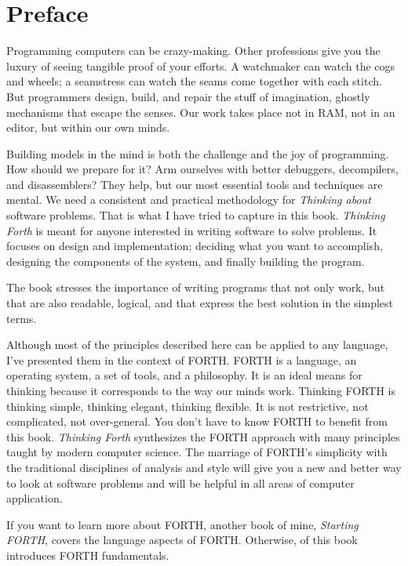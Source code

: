 \chapter*{Preface}

Programming computers can be crazy-making. Other professions give
you the luxury of seeing tangible proof of your efforts. A watchmaker
can watch the cogs and wheels; a seamstress can watch the seams come
together with each stitch. But programmers design, build, and repair
the stuff of imagination, ghostly mechanisms that escape the senses.
Our work takes place not in RAM, not in an editor, but within our
own minds.

Building models in the mind is both the challenge and the joy of programming.
How should we prepare for it? Arm ourselves with better debuggers,
decompilers, and disassemblers? They help, but our most essential
tools and techniques are mental. We need a consistent and practical
methodology for \emph{Thinking about} software problems. That is what
I have tried to capture in this book. \emph{Thinking Forth} is meant
for anyone interested in writing software to solve problems. It focuses
on design and implementation; deciding what you want to accomplish,
designing the components of the system, and finally building the program.

The book stresses the importance of writing programs that not only
work, but that are also readable, logical, and that express the best
solution in the simplest terms.

Although most of the principles described here can be applied to any
language, I've presented them in the context of FORTH. FORTH is a
language, an operating system, a set of tools, and a philosophy. It
is an ideal means for thinking because it corresponds to the way our
minds work. Thinking FORTH is thinking simple, thinking elegant, thinking
flexible. It is not restrictive, not complicated, not over-general.
You don't have to know FORTH to benefit from this book. \emph{Thinking
Forth} synthesizes the FORTH approach with many principles taught
by modern computer science. The marriage of FORTH's simplicity with
the traditional disciplines of analysis and style will give you a
new and better way to look at software problems and will be helpful
in all areas of computer application.

If you want to learn more about FORTH, another book of mine,
\emph{Starting FORTH}, covers the language aspects of
FORTH. Otherwise,  of this book introduces FORTH fundamentals.

